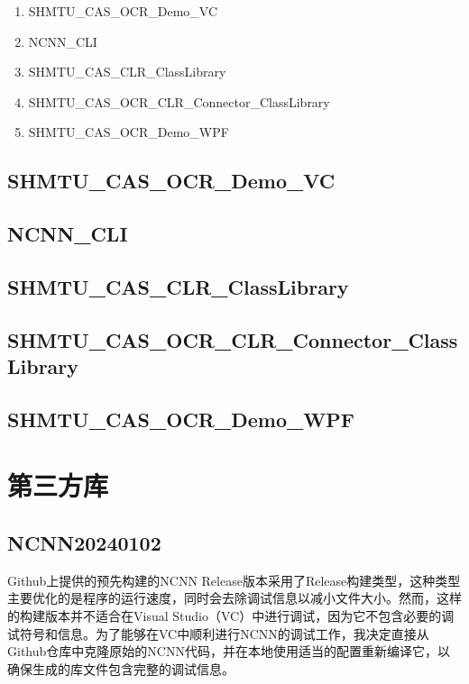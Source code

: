 \begin{enumerate}
	\item SHMTU\_CAS\_OCR\_Demo\_VC
	\item NCNN\_CLI
	\item SHMTU\_CAS\_CLR\_ClassLibrary
	\item SHMTU\_CAS\_OCR\_CLR\_Connector\_ClassLibrary
	\item SHMTU\_CAS\_OCR\_Demo\_WPF
\end{enumerate}

\subsection{SHMTU\_CAS\_OCR\_Demo\_VC}

\subsection{NCNN\_CLI}

\subsection{SHMTU\_CAS\_CLR\_ClassLibrary}

\subsection{SHMTU\_CAS\_OCR\_CLR\_Connector\_ClassLibrary}

\subsection{SHMTU\_CAS\_OCR\_Demo\_WPF}

\section{第三方库}

\subsection{NCNN20240102}

Github上提供的预先构建的NCNN Release版本采用了Release构建类型，这种类型主要优化的是程序的运行速度，同时会去除调试信息以减小文件大小。然而，这样的构建版本并不适合在Visual Studio（VC）中进行调试，因为它不包含必要的调试符号和信息。为了能够在VC中顺利进行NCNN的调试工作，我决定直接从Github仓库中克隆原始的NCNN代码，并在本地使用适当的配置重新编译它，以确保生成的库文件包含完整的调试信息。

